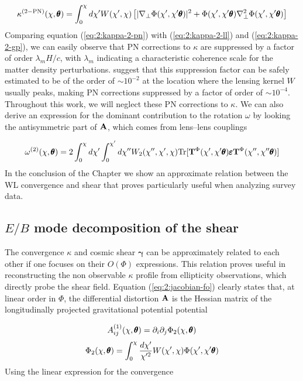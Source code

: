 \begin{equation}
\label{eq:2:kappa-2-pn}
\kappa^{(2-{\rm PN})}(\chi,\pmb{\theta}) = \int_0^\chi d\chi' W(\chi',\chi)\left[\vert\nabla_\perp\Phi(\chi',\chi'\pmb{\theta})\vert^2+\Phi(\chi',\chi'\pmb{\theta})\nabla_\perp^2\Phi(\chi',\chi'\pmb{\theta})\right]
\end{equation}
%
Comparing equation (\ref{eq:2:kappa-2-pn}) with (\ref{eq:2:kappa-2-ll}) and (\ref{eq:2:kappa-2-gp}), we can easily observe that PN corrections to $\kappa$ are suppressed by a factor of order $\lambda_m H/c$, with $\lambda_m$ indicating a characteristic coherence scale for the matter density perturbations. \citep{PNLensing} suggest that this suppression factor can be safely estimated to be of the order of $\sim 10^{-2}$ at the location where the lensing kernel $W$ usually peaks, making PN corrections suppressed by a factor of order of $\sim 10^{-4}$. Throughout this work, we will neglect these PN corrections to $\kappa$. We can also derive an expression for the dominant contribution to the rotation $\omega$ by looking the antisymmetric part of $\mathbf{A}$, which comes from lens--lens couplings

\begin{equation}
\label{eq:2:omega-2-ll}
\omega^{(2)}(\chi,\pmb{\theta}) = 2\int_0^\chi d\chi'\int_0^{\chi'}d\chi'' W_2(\chi'',\chi',\chi){\rm Tr}[\mathbf{T}^{\Phi}(\chi',\chi'\pmb{\theta})\pmb{\varepsilon}\mathbf{T}^{\Phi}(\chi'',\chi''\pmb{\theta})]
\end{equation} 
%
In the conclusion of the Chapter we show an approximate relation between the WL convergence and shear that proves particularly useful when analyzing survey data.

\subsection{$E/B$ mode decomposition of the shear}
The convergence $\kappa$ and cosmic shear $\pmb{\gamma}$ can be approximately related to each other if one focuses on their $O(\Phi)$ expressions. This relation proves useful in reconstructing the non observable $\kappa$ profile from ellipticity observations, which directly probe the shear field. Equation (\ref{eq:2:jacobian-fo}) clearly states that, at linear order in $\Phi$, the differential distortion $\mathbf{A}$ is the Hessian matrix of the longitudinally projected gravitational potential potential 

\begin{equation}
\label{eq:2:projection-fo-1}
A^{(1)}_{ij}(\chi,\pmb{\theta}) = \partial_i\partial_j \Phi_2(\chi,\pmb{\theta}) \\ \\
\end{equation}
%
\begin{equation}
\label{eq:2:projection-fo-2}
\Phi_2(\chi,\pmb{\theta}) = \int_0^\chi \frac{d\chi'}{\chi'^2} W(\chi',\chi)\Phi(\chi',\chi'\pmb{\theta})
\end{equation}
%
Using the linear expression for the convergence

